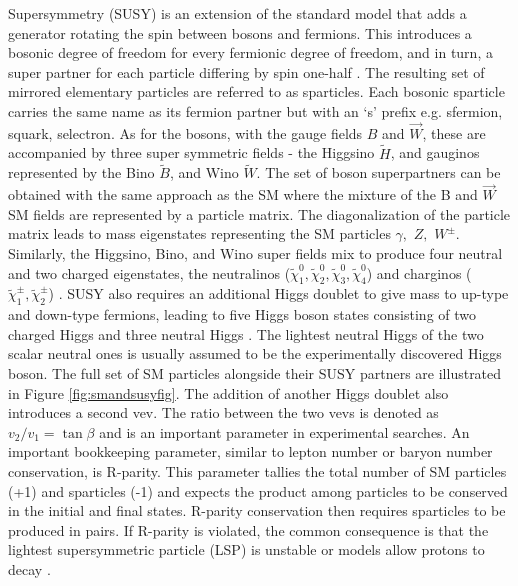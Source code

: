 Supersymmetry (SUSY) is an extension of the standard model that adds a generator rotating the spin between bosons and fermions. This introduces a bosonic degree of freedom for every fermionic degree of freedom, and in turn, a super partner for each particle differing by spin one-half \cite{Baer:2007izw}.  The resulting set of mirrored elementary particles are referred to as sparticles. Each bosonic sparticle carries the same name as its fermion partner but with an `s' prefix e.g. sfermion, squark, selectron. As for the bosons, with the gauge fields $B$ and $\vec{W}$, these are accompanied by three super symmetric fields - the Higgsino $\tilde{H}$, and gauginos represented by the Bino $\tilde{B}$, and Wino $\tilde{W}$. The set of boson superpartners can be obtained with the same approach as the SM where the mixture of the B and $\vec{W}$ SM fields are represented by a particle matrix.  The diagonalization of the particle matrix leads to mass eigenstates representing the SM particles $\gamma, \, \, Z, \, \, W^\pm$. Similarly, the Higgsino, Bino, and Wino super fields mix to produce four neutral and two charged eigenstates, the neutralinos ($\tilde{\chi}^0_1, \tilde{\chi}^0_2, \tilde{\chi}^0_3, \tilde{\chi}^0_4$)  and charginos ($\tilde{\chi}^\pm_1, \tilde{\chi}^\pm_2$) \cite{DJOUADI_2008}. SUSY also requires an additional Higgs doublet to give mass to up-type and down-type fermions,  leading to five Higgs boson states consisting of two charged Higgs and three neutral Higgs \cite{Adam:2021rrw}. The lightest neutral Higgs of the two scalar neutral ones is usually assumed to be the experimentally discovered Higgs boson. The full set of SM particles alongside their SUSY partners are illustrated in Figure \ref{fig:smandsusyfig}. The addition of another Higgs doublet also introduces a second vev. The ratio between the two vevs is denoted as $v_2/v_1 = \tan \beta$ and is an important parameter in experimental searches. An important bookkeeping parameter, similar to lepton number or baryon number conservation, is R-parity. This parameter tallies the total number of SM particles (+1) and sparticles (-1) and expects the product among particles to be conserved in the initial and final states. R-parity conservation then requires sparticles to be produced in pairs. If R-parity is violated, the common consequence is that the lightest supersymmetric particle (LSP) is unstable or models allow protons to decay \cite{Farrar:1978xj}. 




